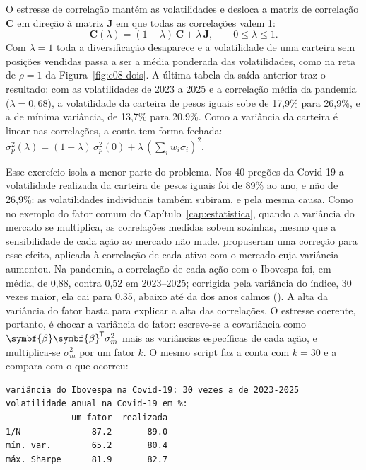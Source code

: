 O estresse de correlação mantém as volatilidades e desloca a matriz de correlação $\symbf{C}$ em direção à matriz $\symbf{J}$ em que todas as correlações valem 1:
\begin{equation}
  \symbf{C}(\lambda) = (1-\lambda)\,\symbf{C} + \lambda\,\symbf{J}, \qquad 0 \le \lambda \le 1 .
  \label{eq:c08-corr}
\end{equation}
Com $\lambda = 1$ toda a diversificação desaparece e a volatilidade de uma carteira sem posições vendidas passa a ser a média ponderada das volatilidades, como na reta de $\rho = 1$ da Figura~\ref{fig:c08-dois}. A última tabela da saída anterior traz o resultado: com as volatilidades de 2023 a 2025 e a correlação média da pandemia ($\lambda = 0,68$), a volatilidade da carteira de pesos iguais sobe de 17,9\% para 26,9\%, e a de mínima variância, de 13,7\% para 20,9\%. Como a variância da carteira é linear nas correlações, a conta tem forma fechada: $\sigma_p^2(\lambda) = (1-\lambda)\,\sigma_p^2(0) + \lambda\,(\sum_i w_i\sigma_i)^2$.

Esse exercício isola a menor parte do problema. Nos 40 pregões da Covid-19 a volatilidade realizada da carteira de pesos iguais foi de 89\% ao ano, e não de 26,9\%: as volatilidades individuais também subiram, e pela mesma causa. Como no exemplo do fator comum do Capítulo~\ref{cap:estatistica}, quando a variância do mercado se multiplica, as correlações medidas sobem sozinhas, mesmo que a sensibilidade de cada ação ao mercado não mude. \citet{forbes2002} propuseram uma correção para esse efeito, aplicada à correlação de cada ativo com o mercado cuja variância aumentou. Na pandemia, a correlação de cada ação com o Ibovespa foi, em média, de 0,88, contra 0,52 em 2023--2025; corrigida pela variância do índice, 30 vezes maior, ela cai para 0,35, abaixo até da dos anos calmos (). A alta da variância do fator basta para explicar a alta das correlações. O estresse coerente, portanto, é chocar a variância do fator: escreve-se a covariância como $\symbf{\beta}\symbf{\beta}\T\sigma_m^2$ mais as variâncias específicas de cada ação, e multiplica-se $\sigma_m^2$ por um fator $k$. O mesmo script faz a conta com $k = 30$ e a compara com o que ocorreu:

\begin{lstlisting}[style=saida]
variância do Ibovespa na Covid-19: 30 vezes a de 2023-2025
volatilidade anual na Covid-19 em %:
             um fator  realizada
1/N              87.2       89.0
mín. var.        65.2       80.4
máx. Sharpe      81.9       82.7
\end{lstlisting}

